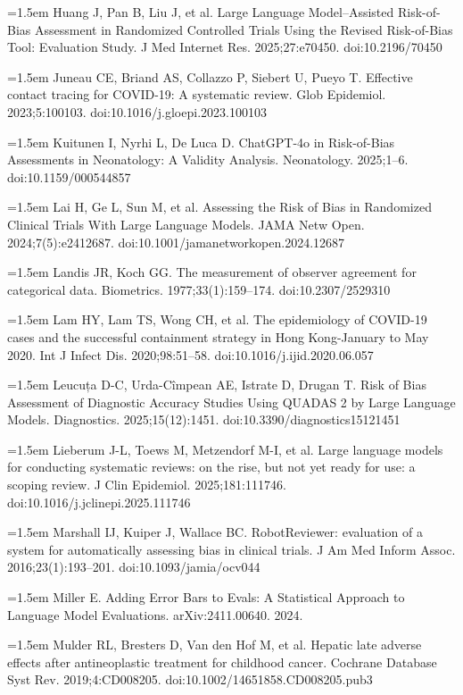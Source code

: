 \documentclass[11pt,a4paper]{article}
\newcommand{\referenceitem}[1]{\noindent\hangafter=1\hangindent=1.5em #1\par\medskip}
\begin{document}
\referenceitem{Huang J, Pan B, Liu J, et al. Large Language Model–Assisted Risk-of-Bias Assessment in Randomized Controlled Trials Using the Revised Risk-of-Bias Tool: Evaluation Study. J Med Internet Res. 2025;27:e70450. doi:10.2196/70450}

\referenceitem{Juneau CE, Briand AS, Collazzo P, Siebert U, Pueyo T. Effective contact tracing for COVID-19: A systematic review. Glob Epidemiol. 2023;5:100103. doi:10.1016/j.gloepi.2023.100103}

\referenceitem{Kuitunen I, Nyrhi L, De Luca D. ChatGPT-4o in Risk-of-Bias Assessments in Neonatology: A Validity Analysis. Neonatology. 2025;1–6. doi:10.1159/000544857}

\referenceitem{Lai H, Ge L, Sun M, et al. Assessing the Risk of Bias in Randomized Clinical Trials With Large Language Models. JAMA Netw Open. 2024;7(5):e2412687. doi:10.1001/jamanetworkopen.2024.12687}

\referenceitem{Landis JR, Koch GG. The measurement of observer agreement for categorical data. Biometrics. 1977;33(1):159–174. doi:10.2307/2529310}

\referenceitem{Lam HY, Lam TS, Wong CH, et al. The epidemiology of COVID-19 cases and the successful containment strategy in Hong Kong-January to May 2020. Int J Infect Dis. 2020;98:51–58. doi:10.1016/j.ijid.2020.06.057}

\referenceitem{Leucuța D-C, Urda-Cîmpean AE, Istrate D, Drugan T. Risk of Bias Assessment of Diagnostic Accuracy Studies Using QUADAS 2 by Large Language Models. Diagnostics. 2025;15(12):1451. doi:10.3390/diagnostics15121451}

\referenceitem{Lieberum J-L, Toews M, Metzendorf M-I, et al. Large language models for conducting systematic reviews: on the rise, but not yet ready for use: a scoping review. J Clin Epidemiol. 2025;181:111746. doi:10.1016/j.jclinepi.2025.111746}

\referenceitem{Marshall IJ, Kuiper J, Wallace BC. RobotReviewer: evaluation of a system for automatically assessing bias in clinical trials. J Am Med Inform Assoc. 2016;23(1):193–201. doi:10.1093/jamia/ocv044}

\referenceitem{Miller E. Adding Error Bars to Evals: A Statistical Approach to Language Model Evaluations. arXiv:2411.00640. 2024.}

\referenceitem{Mulder RL, Bresters D, Van den Hof M, et al. Hepatic late adverse effects after antineoplastic treatment for childhood cancer. Cochrane Database Syst Rev. 2019;4:CD008205. doi:10.1002/14651858.CD008205.pub3}
\end{document}
